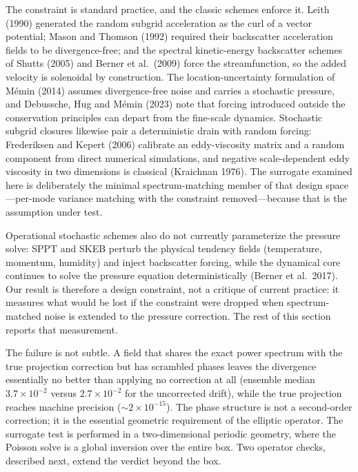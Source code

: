 \documentclass[11pt]{article}
\begin{document}
The constraint is standard practice, and the classic schemes enforce it. Leith (1990) generated the random subgrid acceleration as the curl of a vector potential; Mason and Thomson (1992) required their backscatter acceleration fields to be divergence-free; and the spectral kinetic-energy backscatter schemes of Shutts (2005) and Berner et al.\ (2009) force the streamfunction, so the added velocity is solenoidal by construction. The location-uncertainty formulation of M\'emin (2014) assumes divergence-free noise and carries a stochastic pressure, and Debussche, Hug and M\'emin (2023) note that forcing introduced outside the conservation principles can depart from the fine-scale dynamics. Stochastic subgrid closures likewise pair a deterministic drain with random forcing: Frederiksen and Kepert (2006) calibrate an eddy-viscosity matrix and a random component from direct numerical simulations, and negative scale-dependent eddy viscosity in two dimensions is classical (Kraichnan 1976). The surrogate examined here is deliberately the minimal spectrum-matching member of that design space---per-mode variance matching with the constraint removed---because that is the assumption under test.

Operational stochastic schemes also do not currently parameterize the pressure solve: SPPT and SKEB perturb the physical tendency fields (temperature, momentum, humidity) and inject backscatter forcing, while the dynamical core continues to solve the pressure equation deterministically (Berner et al.\ 2017). Our result is therefore a design constraint, not a critique of current practice: it measures what would be lost if the constraint were dropped when spectrum-matched noise is extended to the pressure correction. The rest of this section reports that measurement.

The failure is not subtle. A field that shares the exact power spectrum with the true projection correction but has scrambled phases leaves the divergence essentially no better than applying no correction at all (ensemble median $3.7\times10^{-2}$ versus $2.7\times10^{-2}$ for the uncorrected drift), while the true projection reaches machine precision ($\sim2\times10^{-15}$). The phase structure is not a second-order correction; it is the essential geometric requirement of the elliptic operator. The surrogate test is performed in a two-dimensional periodic geometry, where the Poisson solve is a global inversion over the entire box. Two operator checks, described next, extend the verdict beyond the box.
\end{document}
